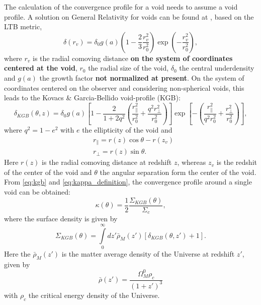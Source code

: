 The calculation of the convergence profile for a void needs to assume a void profile. A solution on General Relativity for voids can be found at \cite{2008JCAP...04..003G,2016MNRAS.455.1246F,2016MNRAS.462.1882K}, based on the LTB metric,
\begin{equation}
\delta(r_v) = \delta_0g(a)\left(1-\frac{2}{3}\frac{r_v^2}{r_0^2}\right)\exp\left(-\frac{r_v^2}{r_0^2}\right),
\end{equation}
where $r_v$ is the radial comoving distance {\bf on the system of coordinates centered at the void}, $r_0$ the radial size of the void, $\delta_0$ the central underdensity and $g(a)$ the growth factor {\bf not normalized at present}. On the system of coordinates centered on the observer and considering non-spherical voids, this leads to the Kovacs \& Garcia-Bellido void-profile (KGB):
\begin{equation}
\delta_{KGB}(\theta,z) = \delta_0g(a)\left[1-\frac{2}{1+2q^2}\left(\frac{r_\parallel^2}{r_0^2}+\frac{q^2r_\perp^2}{r_0^2}\right)\right]\exp\left[-\left(\frac{r_\parallel^2}{q^2r_0^2}+\frac{r_\perp^2}{r_0^2}\right)\right],
\label{eq:kgb}
\end{equation}
where $q^2=1-e^2$ with $e$ the ellipticity of the void and
\begin{eqnarray}
&r_\parallel=r(z)\cos\theta -r(z_v)\\
&r_\perp=r(z)\sin\theta.
\end{eqnarray}
Here $r(z)$ is the radial comoving distance at redshift $z$, whereas $z_v$ is the redshit of the center of the void and $\theta$ the angular separation form the center of the void. From \autoref{eq:kgb} and \autoref{eq:kappa_definition}, the convergence profile around a single void can be obtained:
\begin{equation}
\kappa(\theta) = \frac{1}{2}\frac{\Sigma_{KGB}(\theta)}{\Sigma_c},
\label{eq:kappakrause}
\end{equation}
where the surface density is given by
\begin{equation}
\Sigma_{KGB}(\theta) = \int\limits_0^\infty dz'\bar\rho_M(z')[\delta_{KGB}(\theta,z')+1].
\end{equation}
Here the $\bar\rho_M(z')$ is the matter average density of the Universe at redshift $z'$, given by
\begin{equation}
\bar\rho(z') = \frac{\Omega_M^0\rho_c}{(1+z')^3}
\end{equation}
with $\rho_c$ the critical energy density of the Universe.